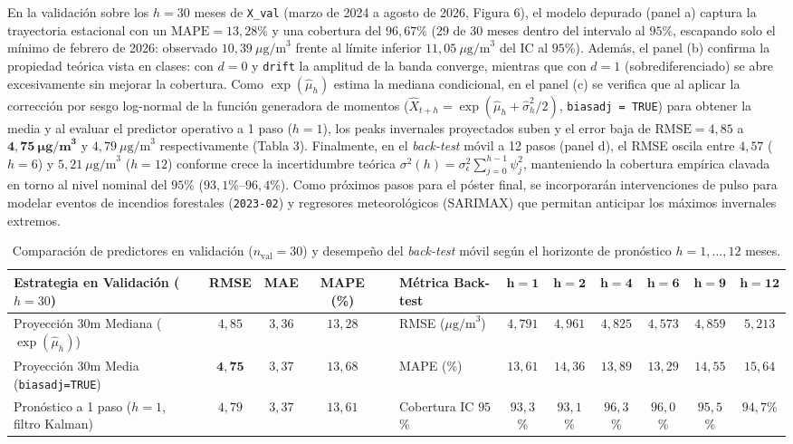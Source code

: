 \documentclass[10pt, a4paper]{article}
\begin{document}
En la validación sobre los $h = 30$ meses de \texttt{X\_val} (marzo de 2024 a agosto de 2026, Figura 6), el modelo depurado (panel a) captura la trayectoria estacional con un $\text{MAPE} = 13,28$\% y una cobertura del $96,67$\% (29 de 30 meses dentro del intervalo al $95$\%, escapando solo el mínimo de febrero de 2026: observado $10,39\ \mu\text{g/m}^3$ frente al límite inferior $11,05\ \mu\text{g/m}^3$ del IC al $95$\%). Además, el panel (b) confirma la propiedad teórica vista en clases: con $d = 0$ y \texttt{drift} la amplitud de la banda converge, mientras que con $d = 1$ (sobrediferenciado) se abre excesivamente sin mejorar la cobertura. Como $\exp(\hat{\mu}_h)$ estima la mediana condicional, en el panel (c) se verifica que al aplicar la corrección por sesgo log-normal de la función generadora de momentos ($\hat{X}_{t+h} = \exp(\hat{\mu}_h + \hat{\sigma}_h^2/2)$, \texttt{biasadj = TRUE}) para obtener la media y al evaluar el predictor operativo a 1 paso ($h = 1$), los peaks invernales proyectados suben y el error baja de $\text{RMSE} = 4,85$ a $\mathbf{4,75\ \mu\text{g/m}^3}$ y $4,79\ \mu\text{g/m}^3$ respectivamente (Tabla 3). Finalmente, en el \textit{back-test} móvil a 12 pasos (panel d), el RMSE oscila entre $4,57$ ($h = 6$) y $5,21\ \mu\text{g/m}^3$ ($h = 12$) conforme crece la incertidumbre teórica $\sigma^2(h) = \sigma_\epsilon^2 \sum_{j=0}^{h-1}\psi_j^2$, manteniendo la cobertura empírica clavada en torno al nivel nominal del $95$\% ($93,1$\%--$96,4$\%). Como próximos pasos para el póster final, se incorporarán intervenciones de pulso para modelar eventos de incendios forestales (\texttt{2023-02}) y regresores meteorológicos (SARIMAX) que permitan anticipar los máximos invernales extremos.

\begin{table}[H]
\centering
\scriptsize
\setlength{\tabcolsep}{2.3pt}
\caption{Comparación de predictores en validación ($n_{\text{val}}=30$) y desempeño del \textit{back-test} móvil según el horizonte de pronóstico $h = 1, \dots, 12$ meses.}
\begin{tabular}{lcccclcccccc}
\toprule
\textbf{Estrategia en Validación ($h=30$)} & \textbf{RMSE} & \textbf{MAE} & \textbf{MAPE (\%)} & & \textbf{Métrica Back-test} & $\mathbf{h=1}$ & $\mathbf{h=2}$ & $\mathbf{h=4}$ & $\mathbf{h=6}$ & $\mathbf{h=9}$ & $\mathbf{h=12}$ \\
\midrule
Proyección 30m Mediana ($\exp(\hat{\mu}_h)$) & $4,85$ & $3,36$ & $13,28$ & & RMSE ($\mu\text{g/m}^3$) & $4,791$ & $4,961$ & $4,825$ & $4,573$ & $4,859$ & $5,213$ \\
Proyección 30m Media (\texttt{biasadj=TRUE}) & $\mathbf{4,75}$ & $3,37$ & $13,68$ & & MAPE (\%) & $13,61$ & $14,36$ & $13,89$ & $13,29$ & $14,55$ & $15,64$ \\
Pronóstico a 1 paso ($h=1$, filtro Kalman) & $4,79$ & $3,37$ & $13,61$ & & Cobertura IC $95$\% & $93,3$\% & $93,1$\% & $96,3$\% & $96,0$\% & $95,5$\% & $94,7$\% \\
\bottomrule
\end{tabular}
\end{table}
\vspace{-0.25cm}
\end{document}
